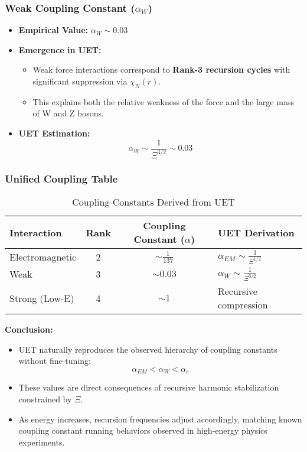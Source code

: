 \documentclass[12pt,a4paper]{article}
\begin{document}
\subsubsection*{Weak Coupling Constant (\(\alpha_W\))}

\begin{itemize}
    \item \textbf{Empirical Value:} \(\alpha_W \sim 0.03\)
    \item \textbf{Emergence in UET:} 
    \begin{itemize}
        \item Weak force interactions correspond to \textbf{Rank-3 recursion cycles} with significant suppression via \(\chi_N(r)\).
        \item This explains both the relative weakness of the force and the large mass of W and Z bosons.
    \end{itemize}
    \item \textbf{UET Estimation:}
    \[
    \alpha_W \sim \frac{1}{\Xi^{3/2}} \sim 0.03
    \]
\end{itemize}

\subsubsection*{Unified Coupling Table}

\begin{table}[h]
\centering
\begin{tabular}{|l|c|c|l|}
\hline
\textbf{Interaction} & \textbf{Rank} & \textbf{Coupling Constant (\(\alpha\))} & \textbf{UET Derivation} \\
\hline
Electromagnetic & 2 & \(\sim \frac{1}{137}\) & \(\alpha_{EM} \sim \frac{1}{\Xi^{1/2}}\) \\
Weak & 3 & \(\sim 0.03\) & \(\alpha_W \sim \frac{1}{\Xi^{3/2}}\) \\
Strong (Low-E) & 4 & \(\sim 1\) & Recursive compression \\
\hline
\end{tabular}
\caption{Coupling Constants Derived from UET}
\end{table}

\textbf{Conclusion:}
\begin{itemize}
    \item UET naturally reproduces the observed hierarchy of coupling constants without fine-tuning:
    \[
    \alpha_{EM} < \alpha_W < \alpha_s
    \]
    \item These values are direct consequences of recursive harmonic stabilization constrained by \(\Xi\).
    \item As energy increases, recursion frequencies adjust accordingly, matching known coupling constant running behaviors observed in high-energy physics experiments.
\end{itemize}
\end{document}

